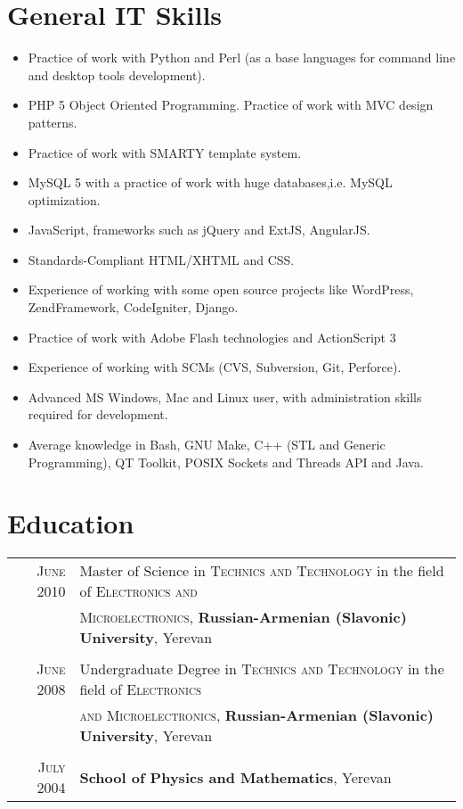\documentclass[a4paper,10pt]{article}
\begin{document}
\section{General IT Skills}
\begin{itemize}
  \item[] Practice of work with Python and Perl (as a base languages for
  command line and desktop tools development).

	\item[] PHP 5 Object Oriented Programming. Practice of work with MVC design
	patterns.

	\item[] Practice of work with SMARTY template system.

	\item[] MySQL 5 with a practice of work with huge databases,i.e. MySQL
		optimization.

	\item[] JavaScript, frameworks such as jQuery and ExtJS, AngularJS.

	\item[] Standards-Compliant HTML/XHTML and CSS.

	\item[] Experience of working with some open source projects like WordPress,
		ZendFramework, CodeIgniter, Django.

	\item[] Practice of work with Adobe Flash technologies and
		ActionScript 3

	\item[] Experience of working with SCMs (CVS, Subversion, Git, Perforce).

	\item[] Advanced MS Windows, Mac and Linux user, with administration skills required
		for development.

	\item[] Average knowledge in Bash, GNU Make, C++ (STL and Generic
		Programming), QT Toolkit, POSIX Sockets and Threads API and Java.
\end{itemize}

\section{Education}
\begin{tabular}{rl}
\textsc{June} 2010 & Master of Science in \textsc{Technics and Technology}
 in the field of \textsc{Electronics and} \\ & \textsc{Microelectronics}, 
\textbf{Russian-Armenian (Slavonic) University}, Yerevan\\ 
&\\
\textsc{June} 2008 & Undergraduate Degree in \textsc{Technics and Technology}
 in the field of \textsc{Electronics} \\ & \textsc{and Microelectronics}, 
\textbf{Russian-Armenian (Slavonic) University}, Yerevan\\
&\\
\textsc{July} 2004& \textbf{School of Physics and Mathematics}, Yerevan
\end{tabular}
\end{document}
